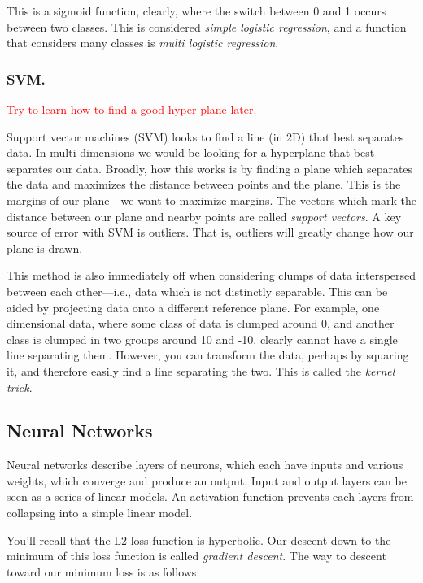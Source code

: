 This is a sigmoid function, clearly, where the switch between 0 and 1 occurs between two classes. This is considered \textit{simple logistic regression}, and a function that considers many classes is \textit{multi logistic regression}. 



\subsubsection{SVM.}

\textcolor{red}{Try to learn how to find a good hyper plane later.}\newline

Support vector machines (SVM) looks to find a line (in 2D) that best separates data. In multi-dimensions we would be looking for a hyperplane that best separates our data. Broadly, how this works is by finding a plane which separates the data and maximizes the distance between points and the plane. This is the margins of our plane---we want to maximize margins. The vectors which mark the distance between our plane and nearby points are called \textit{support vectors}. A key source of error with SVM is outliers. That is, outliers will greatly change how our plane is drawn.\newline

This method is also immediately off when considering clumps of data interspersed between each other---i.e., data which is not distinctly separable. This can be aided by projecting data onto a different reference plane. For example, one dimensional data, where some class of data is clumped around 0, and another class is clumped in two groups around 10 and -10, clearly cannot have a single line separating them. However, you can transform the data, perhaps by squaring it, and therefore easily find a line separating the two. This is called the \textit{kernel trick}. 

\subsection{Neural Networks}

Neural networks describe layers of neurons, which each have inputs and various weights, which converge and produce an output. Input and output layers can be seen as a series of linear models. An activation function prevents each layers from collapsing into a simple linear model.\newline

You'll recall that the L2 loss function is hyperbolic. Our descent down to the minimum of this loss function is called \textit{gradient descent}. The way to descent toward our minimum loss is as follows: 

